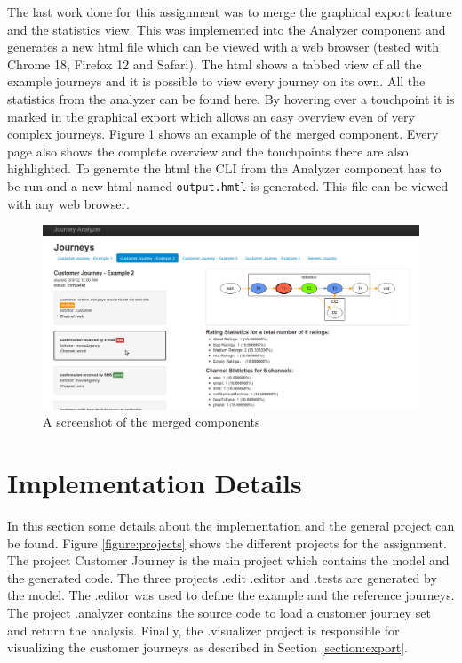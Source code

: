 \documentclass[12pt]{scrartcl}
\begin{document}
The last work done for this assignment was to merge the graphical export feature and the statistics view. This was
implemented into the Analyzer component and generates a new html file which can be viewed with a web browser (tested
with Chrome 18, Firefox 12 and Safari). The html shows a tabbed view of all the example journeys and it is possible to view
every journey on its own. All the statistics from the analyzer can be found here. By hovering over a touchpoint
it is marked in the graphical export which allows an easy overview even of very complex journeys. 
Figure \ref{figure:merge_figure} shows an example of the merged component. Every page also shows the complete overview
and the touchpoints there are also highlighted. To generate the html the CLI from the Analyzer component has to be run
and a new html named \lstinline!output.hmtl! is generated. This file can be viewed with any web browser.

\begin{figure}[hbtp]
	\centering
	\includegraphics[scale=0.35]{img/merge_sample1.png}
	\caption{A screenshot of the merged components}
	\label{figure:merge_figure}
\end{figure}


\section{Implementation Details}
\label{section:impl}

In this section some details about the implementation and the general project can be found. Figure \ref{figure:projects} 
shows the different projects for the assignment. The project Customer Journey is the main project 
which contains the model and the generated code. The three projects .edit .editor and .tests are generated by the model. 
The .editor was used to define the example and the reference journeys. The project .analyzer contains the source code to 
load a customer journey set and return the analysis. Finally, the .visualizer project is responsible for visualizing the 
customer journeys as described in Section \ref{section:export}.
\end{document}
